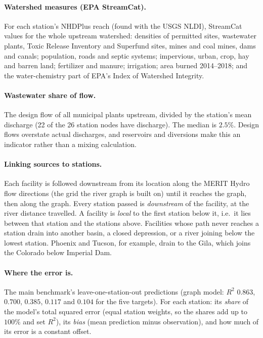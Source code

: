 \documentclass[11pt]{article}
\begin{document}
\paragraph{Watershed measures (EPA StreamCat).} For each station's NHDPlus reach (found with the
USGS NLDI), StreamCat values for the whole upstream watershed: densities of permitted sites,
wastewater plants, Toxic Release Inventory and Superfund sites, mines and coal mines, dams and
canals; population, roads and septic systems; impervious, urban, crop, hay and barren land;
fertilizer and manure; irrigation; area burned 2014--2018; and the water-chemistry part of EPA's
Index of Watershed Integrity.

\paragraph{Wastewater share of flow.} The design flow of all municipal plants upstream, divided by
the station's mean discharge (22 of the 26 station nodes have discharge). The median is $2.5\%$.
Design flows overstate actual discharges, and reservoirs and diversions make this an indicator
rather than a mixing calculation.

\paragraph{Linking sources to stations.} Each facility is followed downstream from its location
along the MERIT Hydro flow directions (the grid the river graph is built on) until it reaches the
graph, then along the graph. Every station passed is \emph{downstream} of the facility, at the river
distance travelled. A facility is \emph{local} to the first station below it, i.e.\ it lies between
that station and the stations above. Facilities whose path never reaches a station drain into
another basin, a closed depression, or a river joining below the lowest station. Phoenix and
Tucson, for example, drain to the Gila, which joins the Colorado below Imperial Dam.

\paragraph{Where the error is.} The main benchmark's leave-one-station-out predictions (graph model:
$R^2$ $0.863$, $0.700$, $0.385$, $0.117$ and $0.104$ for the five targets). For each station:
its \emph{share} of the model's total squared error (equal station weights, so the shares add up
to $100\%$ and set $R^2$), its \emph{bias} (mean prediction minus observation), and how much of
its error is a constant offset.
\end{document}

